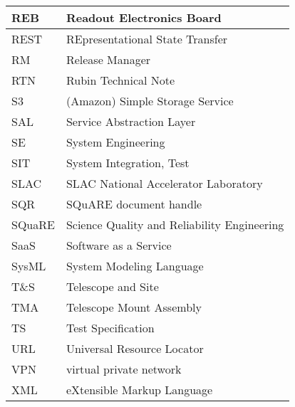 \begin{longtable}{p{}p{}}
REB & Readout Electronics Board \\\hline
REST & REpresentational State Transfer \\\hline
RM & Release Manager \\\hline
RTN & Rubin Technical Note \\\hline
S3 & (Amazon) Simple Storage Service  \\\hline
SAL & Service Abstraction Layer \\\hline
SE & System Engineering \\\hline
SIT & System Integration, Test \\\hline
SLAC & SLAC National Accelerator Laboratory \\\hline
SQR & SQuARE document handle \\\hline
SQuaRE & Science Quality and Reliability Engineering \\\hline
SaaS & Software as a Service \\\hline
SysML & System Modeling Language \\\hline
T\&S & Telescope and Site \\\hline
TMA & Telescope Mount Assembly \\\hline
TS & Test Specification \\\hline
URL & Universal Resource Locator \\\hline
VPN & virtual private network \\\hline
XML & eXtensible Markup Language \\\hline
\end{longtable}
